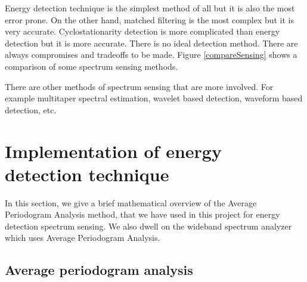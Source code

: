 Energy detection technique is the simplest method of all but it is also the 
most error prone. On the other hand, matched filtering is the most complex but 
it is very accurate. Cyclostationarity detection is more complicated than 
energy detection but it is more accurate. There is no ideal detection method.
There are always compromises and tradeoffs to be made. Figure 
\ref{compareSensing} shows a comparison of some spectrum sensing methods.

There are other methods of spectrum sensing that are more involved. For
example multitaper spectral estimation, wavelet based detection, waveform
based detection, etc.


\section{Implementation of energy detection technique}

In this section, we give a brief mathematical overview of the Average 
Periodogram Analysis method, that we have used in this project for energy
detection spectrum sensing. We also dwell on the wideband spectrum analyzer 
which uses Average Periodogram Analysis.

\subsection{Average periodogram analysis}

